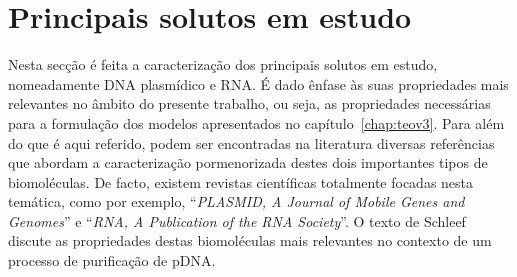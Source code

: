 \section{Principais solutos em estudo} %
\label{sec:solutos}
Nesta secção é feita a caracterização dos principais solutos em estudo, nomeadamente DNA plasmídico e RNA. É dado ênfase às suas propriedades mais relevantes no âmbito do presente trabalho, ou seja, as propriedades necessárias para a formulação dos modelos apresentados no capítulo~\ref{chap:teov3}. Para além do que é aqui referido, podem ser encontradas na literatura diversas referências que abordam a caracterização pormenorizada destes dois importantes tipos de biomoléculas. De facto, existem revistas científicas totalmente focadas nesta temática, como por exemplo, ``\emph{PLASMID, A Journal of Mobile Genes and Genomes}'' e ``\emph{RNA, A Publication of the RNA Society}''. O texto de Schleef \et\ \cite{schleef} discute as propriedades destas biomoléculas mais relevantes no contexto de um processo de purificação de pDNA.

